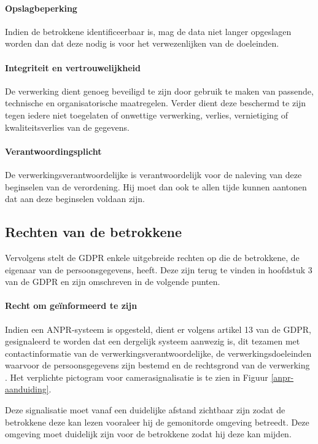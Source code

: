 \paragraph{Opslagbeperking}
Indien de betrokkene identificeerbaar is, mag de data niet langer opgeslagen worden dan dat deze nodig is voor het verwezenlijken van de doeleinden.

\paragraph{Integriteit en vertrouwelijkheid}
De verwerking dient genoeg beveiligd te zijn door gebruik te maken van passende, technische en organisatorische maatregelen. Verder dient deze beschermd te zijn tegen iedere niet toegelaten of onwettige verwerking, verlies, vernietiging of kwaliteitsverlies van de gegevens.

\paragraph{Verantwoordingsplicht}
De verwerkingsverantwoordelijke is verantwoordelijk voor de naleving van deze beginselen van de verordening. Hij moet dan ook te allen tijde kunnen aantonen dat aan deze beginselen voldaan zijn.


\subsection{Rechten van de betrokkene}
\label{rechten-betrokkene}
Vervolgens stelt de GDPR enkele uitgebreide rechten op die de betrokkene, de eigenaar van de persoonsgegevens, heeft. Deze zijn terug te vinden in hoofdstuk 3 van de GDPR en zijn omschreven in de volgende punten.

\paragraph{Recht om geïnformeerd te zijn}
Indien een ANPR-systeem is opgesteld, dient er volgens artikel 13 van de GDPR, gesignaleerd te worden dat een dergelijk systeem aanwezig is, dit tezamen met contactinformatie van de verwerkingsverantwoordelijke, de verwerkingsdoeleinden waarvoor de persoonsgegevens zijn bestemd en de rechtsgrond van de verwerking \autocite{besafe2018picto}. Het verplichte pictogram voor camerasignalisatie is te zien in Figuur \ref{anpr-aanduiding}.

Deze signalisatie moet vanaf een duidelijke afstand zichtbaar zijn zodat de betrokkene deze kan lezen vooraleer hij de gemonitorde omgeving betreedt. Deze omgeving moet duidelijk zijn voor de betrokkene zodat hij deze kan mijden.


